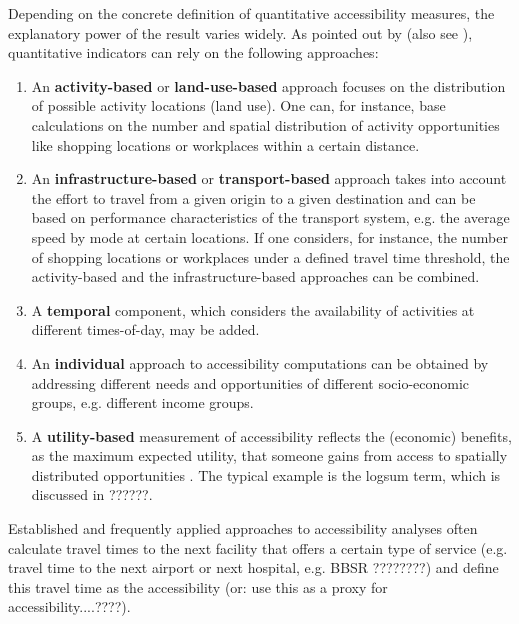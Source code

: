 Depending on the concrete definition of quantitative accessibility measures, the explanatory power of the result varies widely.
%
As pointed out by \citet{NicolaiNagel2012HiResAccessibilityMethodInBook} (also see \citep[e.g.][]{GeursRitsema2001AccessibilityMeasures,Geurs2004AccessibilityReview}), quantitative indicators can rely on the following approaches:
%
\begin{enumerate}
\item An \textbf{activity-based} or \textbf{land-use-based} approach focuses on
the distribution of possible activity locations (land use). One can, for instance,
base calculations on the number and spatial distribution of activity opportunities
like shopping locations or workplaces within a certain distance.
%
\item An \textbf{in\-fra\-struc\-ture-based} or \textbf{transport-based} approach takes
into account the effort to travel from a given origin to a given destination and 
can be based on performance characteristics of the transport system, e.g. the
average speed by mode at certain locations. If one considers, for instance, the
number of shopping locations or workplaces under a defined travel time threshold,
the activity-based and the infrastructure-based approaches can be combined.
%
\item A \textbf{temporal} component, which considers the availability of activities
at different times-of-day, may be added.
%
\item An \textbf{individual} approach to accessibility computations can be
obtained by addressing different needs and opportunities of different socio-economic groups, e.g. different income groups.
%
\item A \textbf{utility-based} measurement of accessibility reflects the
(economic) benefits, as the maximum expected utility, that someone gains
from access to spatially distributed opportunities
\citep{GeursRitsema2001AccessibilityMeasures,deJongEtAl2007LogsumTRA}. The
typical example is the logsum term, which is discussed in ??????.
\end{enumerate}
%
%
Established and frequently applied approaches to accessibility analyses often calculate travel times to the next facility that offers a certain type of service (e.g. travel time to the next airport or next hospital, e.g. BBSR ????????) and define this travel time as the accessibility (or: use this as a proxy for accessibility....????).

